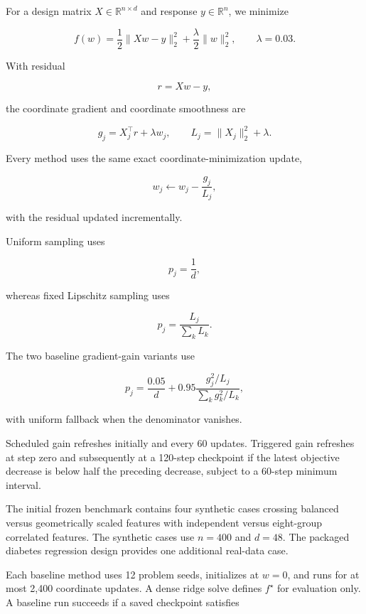 \documentclass[11pt]{article}
\begin{document}
For a design matrix $X\in\mathbb{R}^{n\times d}$ and response
$y\in\mathbb{R}^{n}$, we minimize

\begin{equation}
f(w)
=
\frac{1}{2}\|Xw-y\|_2^2
+
\frac{\lambda}{2}\|w\|_2^2,
\qquad
\lambda=0.03.
\label{eq:ridge}
\end{equation}

With residual

\[
r=Xw-y,
\]

the coordinate gradient and coordinate smoothness are

\begin{equation}
g_j=X_j^\top r+\lambda w_j,
\qquad
L_j=\|X_j\|_2^2+\lambda.
\label{eq:grad-lipschitz}
\end{equation}

Every method uses the same exact coordinate-minimization update,

\begin{equation}
w_j
\leftarrow
w_j-\frac{g_j}{L_j},
\label{eq:coordinate-update}
\end{equation}

with the residual updated incrementally.

Uniform sampling uses

\[
p_j=\frac{1}{d},
\]

whereas fixed Lipschitz sampling uses

\[
p_j
=
\frac{L_j}{\sum_k L_k}.
\]

The two baseline gradient-gain variants use

\begin{equation}
p_j
=
\frac{0.05}{d}
+
0.95
\frac{g_j^2/L_j}
{\sum_k g_k^2/L_k},
\label{eq:gain-probability}
\end{equation}

with uniform fallback when the denominator vanishes.

Scheduled gain refreshes initially and every 60 updates. Triggered gain
refreshes at step zero and subsequently at a 120-step checkpoint if the
latest objective decrease is below half the preceding decrease, subject
to a 60-step minimum interval.

The initial frozen benchmark contains four synthetic cases crossing
balanced versus geometrically scaled features with independent versus
eight-group correlated features. The synthetic cases use
$n=400$ and $d=48$. The packaged diabetes regression design provides
one additional real-data case.

Each baseline method uses 12 problem seeds, initializes at $w=0$, and
runs for at most 2,400 coordinate updates. A dense ridge solve defines
$f^\star$ for evaluation only. A baseline run succeeds if a saved
checkpoint satisfies
\end{document}
